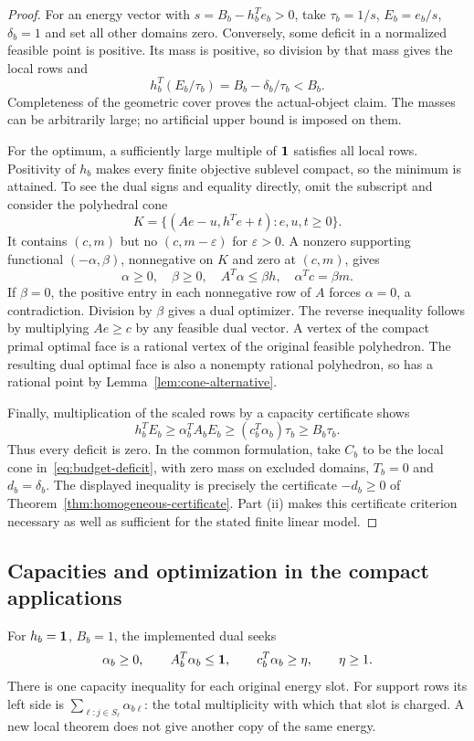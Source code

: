 \begin{proof}
For an energy vector with $s=B_b-h_b^Te_b>0$, take
$\tau_b=1/s$, $E_b=e_b/s$, $\delta_b=1$ and set all other domains
zero. Conversely, some deficit in a normalized feasible point is
positive. Its mass is positive, so division by that mass gives the
local rows and
\[
           h_b^T(E_b/\tau_b)=B_b-\delta_b/\tau_b<B_b.
\]
Completeness of the geometric cover proves the actual-object claim.
The masses can be arbitrarily large; no artificial upper bound is
imposed on them.

For the optimum, a sufficiently large multiple of $\mathbf 1$ satisfies
all local rows. Positivity of $h_b$ makes every finite objective
sublevel compact, so the minimum is attained. To see the dual signs
and equality directly, omit the subscript and consider the polyhedral
cone
\[
       K=\{(Ae-u,h^Te+t):e,u,t\ge0\}.
\]
It contains $(c,m)$ but no $(c,m-\varepsilon)$ for
$\varepsilon>0$. A nonzero supporting functional $(-\alpha,\beta)$,
nonnegative on $K$ and zero at $(c,m)$, gives
\[
 \alpha\ge0,\quad\beta\ge0,\quad A^T\alpha\le\beta h,
                  \quad\alpha^Tc=\beta m.
\]
If $\beta=0$, the positive entry in each nonnegative row of $A$
forces $\alpha=0$, a contradiction. Division by $\beta$ gives a
dual optimizer. The reverse inequality follows by multiplying
$Ae\ge c$ by any feasible dual vector. A vertex of the compact
primal optimal face is a rational vertex of the original feasible
polyhedron. The resulting dual optimal face is also a nonempty
rational polyhedron, so has a rational point by
Lemma~\ref{lem:cone-alternative}.

Finally, multiplication of the scaled rows by a capacity certificate
shows
\[
 h_b^TE_b\ge\alpha_b^TA_bE_b
            \ge(c_b^T\alpha_b)\tau_b\ge B_b\tau_b.
\]
Thus every deficit is zero. In the common formulation, take $C_b$ to
be the local cone in~\eqref{eq:budget-deficit}, with zero mass on
excluded domains, $T_b=0$ and $d_b=\delta_b$.
The displayed inequality is precisely the certificate
$-d_b\ge0$ of Theorem~\ref{thm:homogeneous-certificate}.
Part (ii) makes this certificate criterion necessary as well as
sufficient for the stated finite linear model.
\end{proof}

\subsection{Capacities and optimization in the compact applications}

For $h_b=\mathbf 1$, $B_b=1$, the implemented dual seeks
\begin{equation}\label{eq:capacity-dual}
 \alpha_b\ge0,\qquad A_b^T\alpha_b\le\mathbf 1,\qquad
              c_b^T\alpha_b\ge\eta,\qquad\eta\ge1.
\end{equation}
There is one capacity inequality for each original energy slot. For
support rows its left side is
$\sum_{\ell:j\in S_\ell}\alpha_{b\ell}$: the total multiplicity with
which that slot is charged. A new local theorem does not give another
copy of the same energy.

